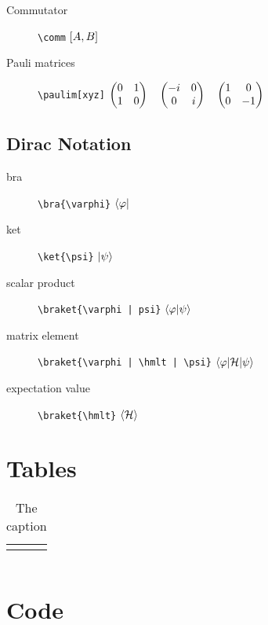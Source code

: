 \documentclass[a4paper]{article}
\begin{document}
\begin{description}
	\item[Commutator] \verb|\comm| \quad $\left[ A, B \right]$
	\item[Pauli matrices] \verb|\paulim[xyz]| \quad $\begin{pmatrix}0 & 1 \\ 1 & 0\end{pmatrix} \quad \begin{pmatrix}-i & 0 \\ 0 & i\end{pmatrix} \quad \begin{pmatrix}1 & 0 \\ 0 & -1\end{pmatrix}$
\end{description}


\subsection{Dirac Notation}

\begin{description}
	\item[bra] \verb|\bra{\varphi}| \quad $\bra{\varphi}$
	\item[ket] \verb|\ket{\psi}| \quad $\ket{\psi}$
	\item[scalar product] \verb+\braket{\varphi | psi}+ \quad $\braket{\varphi | \psi}$
	\item[matrix element] \verb+\braket{\varphi | \hmlt | \psi}+ \quad $\braket{\varphi | \mathcal{H} | \psi}$
	\item[expectation value] \verb+\braket{\hmlt}+ \quad $\braket{\mathcal{H}}$
\end{description}

\section{Tables}

\begin{table}
	\begin{tabu}{rr}
	\tabucline[1pt]{-}
	\end{tabu}
	\caption{The caption}
\end{table}


\begin{sidewaystable}
	\centering
	\begin{tabular}{r|c|l}
	\end{tabular}
\end{sidewaystable}

\section{Code}
\end{document}

